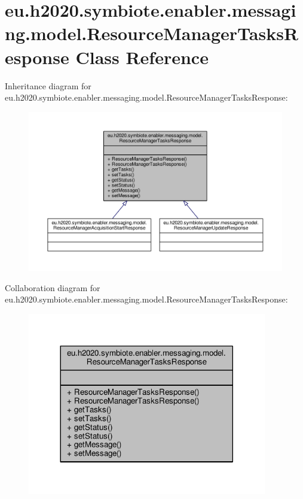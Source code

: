 \hypertarget{classeu_1_1h2020_1_1symbiote_1_1enabler_1_1messaging_1_1model_1_1ResourceManagerTasksResponse}{}\section{eu.\+h2020.\+symbiote.\+enabler.\+messaging.\+model.\+Resource\+Manager\+Tasks\+Response Class Reference}
\label{classeu_1_1h2020_1_1symbiote_1_1enabler_1_1messaging_1_1model_1_1ResourceManagerTasksResponse}


Inheritance diagram for eu.\+h2020.\+symbiote.\+enabler.\+messaging.\+model.\+Resource\+Manager\+Tasks\+Response\+:\nopagebreak
\begin{figure}[H]
\begin{center}
\leavevmode
\includegraphics[width=350pt]{classeu_1_1h2020_1_1symbiote_1_1enabler_1_1messaging_1_1model_1_1ResourceManagerTasksResponse__inherit__graph}
\end{center}
\end{figure}


Collaboration diagram for eu.\+h2020.\+symbiote.\+enabler.\+messaging.\+model.\+Resource\+Manager\+Tasks\+Response\+:\nopagebreak
\begin{figure}[H]
\begin{center}
\leavevmode
\includegraphics[width=296pt]{classeu_1_1h2020_1_1symbiote_1_1enabler_1_1messaging_1_1model_1_1ResourceManagerTasksResponse__coll__graph}
\end{center}
\end{figure}
